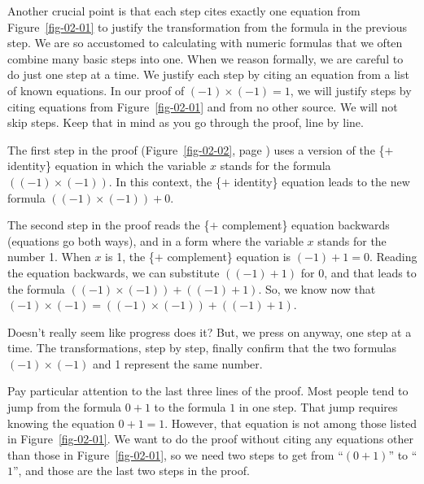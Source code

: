 Another crucial point is that each step cites
exactly one equation from Figure~\ref{fig-02-01}
to justify the transformation from the formula in the previous step.
We are so accustomed to calculating with numeric formulas that
we often combine many basic steps into one. When we reason formally,
we are careful to do just one step at a time.
We justify each step by citing an equation
from a list of known equations. In our proof of $(-1)\times(-1) = 1$,
we will justify steps by citing equations from Figure~\ref{fig-02-01}
and from no other source. We will not skip steps.
Keep that in mind as you go through the proof, line by line.

The first step in the proof
(Figure~\ref{fig-02-02}, page \pageref{fig-02-02}) uses a version of the
\{$+$ identity\} equation in which the variable $x$ stands for the
formula $((-1)\times(-1))$.
In this context, the \{$+$ identity\} equation
leads to the new formula $((-1)\times(-1)) + 0$.

The second step in the proof reads the \{$+$ complement\}
equation backwards (equations go both ways), and in a form
where the variable $x$ stands for the number 1.
When $x$ is 1, the \{$+$ complement\} equation is
$(-1) + 1 = 0$.
Reading the equation backwards, we can substitute
$((-1) + 1)$ for $0$,
and that leads to the formula $((-1)\times(-1)) + ((-1) + 1)$.
So, we know now that
$(-1)\times(-1) = ((-1)\times(-1)) + ((-1) + 1)$.

Doesn't really seem like progress does it?
But, we press on anyway, one step at a time.
The transformations, step by step, finally confirm that the two formulas
$(-1)\times(-1)$ and 1 represent the same number.

Pay particular attention to the last three lines of the proof.
Most people tend to jump from the formula $0+1$ to the
formula $1$ in one step. That jump requires knowing the equation
$0+1 = 1$. However, that equation is not among those listed in
Figure~\ref{fig-02-01}.
We want to do the proof without citing any equations
other than those in Figure~\ref{fig-02-01}, so we need two steps
to get from ``$(0+1)$'' to ``$1$'',
and those are the last two steps in the proof.

